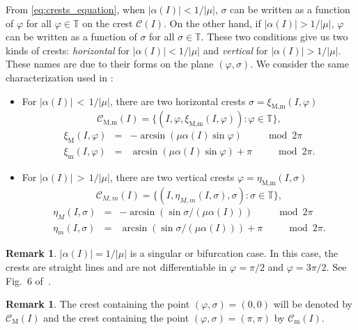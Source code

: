 \documentclass[a4paper,10pt]{article}
\newcommand{\M}{\text{M}}
\newcommand{\m}{\text{m}}
\theoremstyle{definition}
\newtheorem{remark}[theorem]{Remark}
\begin{document}
From \eqref{eq:crests_equation}, when $\left|\alpha(I)\right| <1/\left|\mu\right|$, $\sigma$ can be written as a function of $\varphi$ for all $\varphi\in\mathbb{T}$ on the crest $\mathcal{C}(I)$.
On the other hand, if $\left|\alpha(I)\right| > 1/\left|\mu\right|$, $\varphi$ can be written as a function of $\sigma$ for all $\sigma\in\mathbb{T}.$
These two conditions give us two kinds of crests: \emph{horizontal} for $\left|\alpha(I)\right| <1/\left|\mu\right|$ and \emph{vertical} for  $\left|\alpha(I)\right| > 1/\left|\mu\right|$.
These names are due to their forms on the plane $(\varphi , \sigma)$.
We consider the same characterization used in \cite{Delshams2017}:
\begin{itemize}
\item For $\left|\alpha(I)\right|\, <\, 1/\left|\mu\right|$, there are two horizontal crests $\sigma = \xi_{\M,\m}(I,\varphi)$
$$\mathcal{C}_{\M,\m}(I)=\{(I,\varphi,\xi_{\M,\m}(I,\varphi)):\varphi\in\mathbb{T}\},$$
\begin{eqnarray}\label{eq:cristas_06}
\xi_{\M}(I,\varphi)&=&-\arcsin(\mu\alpha(I)\sin \varphi )  \quad\quad\mod{2\pi}\\
\xi_{\m}(I,\varphi)&=&\arcsin(\mu\alpha(I)\sin \varphi )+\pi \quad\quad\mod{2\pi}.\nonumber
\end{eqnarray}
\item  For $\left|\alpha(I)\right|\, >\, 1/\left|\mu\right|$, there are two vertical crests  $\varphi = \eta_{\M,\m}(I,\sigma)$
$$\mathcal{C}_{M,m}(I)=\{(I,\eta_{M,m}(I,\sigma),\sigma):\sigma\in\mathbb{T}\},$$
\begin{eqnarray*}
\eta_{M}(I,\sigma)&=&-\arcsin(\sin \sigma/\left(\mu \alpha(I)\right))\quad\quad\mod{2\pi} \label{eq:eta_definition}\\
\eta_{m}(I,\sigma)&=&\arcsin(\sin \sigma/\left(\mu \alpha(I)\right))+\pi\quad\quad\mod{2\pi}.\nonumber
\end{eqnarray*}
\end{itemize}

\begin{remark}
\label{rmk:singular}
$\left|\alpha(I)\right| = 1/\left|\mu\right|$ is a singular or bifurcation case.
In this case, the crests are straight lines and are not differentiable in $\varphi = \pi/2$ and $\varphi = 3\pi/2$.
See Fig.~6 of~\cite{Delshams2017}.
\end{remark}
\begin{remark}
The crest containing the point $(\varphi , \sigma) = (0,0)$ will be denoted by $\mathcal{C}_{\M}(I)$  and the crest containing the point $(\varphi , \sigma) = (\pi , \pi)$ by $\mathcal{C}_{\m}(I)$.
\end{remark}
\end{document}
